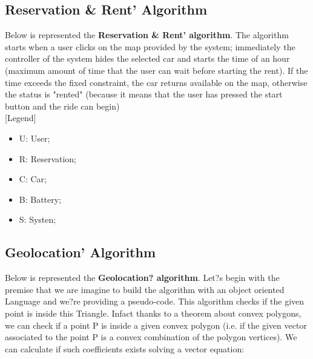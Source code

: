 \subsection{Reservation & Rent' Algorithm}
Below is represented the \textbf{Reservation & Rent' algorithm}. The algorithm starts when a user clicks on the map provided by the system; immediately the controller of the system hides the selected car and starts the time of an hour (maximum amount of time that the user can wait before starting the rent). If the time exceeds the fixed constraint, the car returns available on the map, otherwise the status is "rented" (because it means that the user has pressed the start button and the ride can begin)
\ \\

[Legend]
\begin{itemize}
	\item U: User;
	\item R: Reservation;
	\item C:  Car;
	\item B: Battery;
	\item S: Systen;
\end{itemize}


\newpage
\subsection{Geolocation' Algorithm}
Below is represented the \textbf{Geolocation? algorithm}. Let?s begin with the premise that we are imagine to build the algorithm with an object oriented Language and we?re providing a pseudo-code. This algorithm checks if the given point is inside this Triangle. Infact thanks to a theorem about convex polygons, we can check if a point P is inside a given convex polygon (i.e. if the given vector associated to the point P is a convex combination of the polygon vertices). We can calculate if such coefficients exists solving a vector equation:

